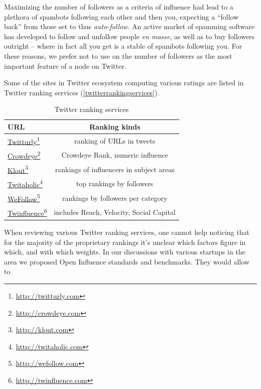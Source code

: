 \documentclass[10pt,oneside]{memoir}
\begin{document}
Maximizing the number of followers as a  criteria of influence had lead to a plethora of spambots following each other and then you, expecting a ``follow back'' from those set to thus {\itshape auto-follow}.  An active market of spamming software has developed to follow and unfollow people {\itshape en masse}, as well as to buy followers outright -- where in fact all you get is a stable of spambots following you.  For these reasons, we prefer not to use on the number of followers as the most important feature of a node on Twitter.


Some of the sites in Twitter ecosystem computing various ratings are listed in Twitter ranking services (\autoref{twitterrankingservices}).


\begin{table}[htbp]
\begin{minipage}{\linewidth}
\setlength{\tymax}{0.5\linewidth}
\centering
\small
\caption{Twitter ranking services}
\label{twitterrankingservices}
\begin{tabulary}{\linewidth}{@{}lc@{}} \\ \toprule 
URL&Ranking kinds \\\midrule
\href{http://twitturly.com}{Twitturly}\footnote{\href{http://twitturly.com}{http://twitturly.com}}&ranking of URLs in tweets \\
\href{http://crowdeye.com}{Crowdeye}\footnote{\href{http://crowdeye.com}{http://crowdeye.com}}&Crowdeye Rank, numeric influence \\
\href{http://klout.com}{Klout}\footnote{\href{http://klout.com}{http://klout.com}}&rankings of influencers in subject areas \\
\href{http://twitaholic.com}{Twitaholic}\footnote{\href{http://twitaholic.com}{http://twitaholic.com}}&top rankings by followers \\
\href{http://wefollow.com}{WeFollow}\footnote{\href{http://wefollow.com}{http://wefollow.com}}&rankings by followers per category \\
\href{http://twinfluence.com}{Twinfluence}\footnote{\href{http://twinfluence.com}{http://twinfluence.com}}&includes Reach, Velocity, Social Capital \\

		\bottomrule
	\end{tabulary}
\end{minipage}
\end{table}

When reviewing various Twitter ranking services, one cannot help noticing that for the majority of the proprietary rankings it's unclear which factors figure in which, and with which weights.  In our discussions with various startups in the area we proposed Open Influence standards and benchmarks.  They would allow to
\end{document}
